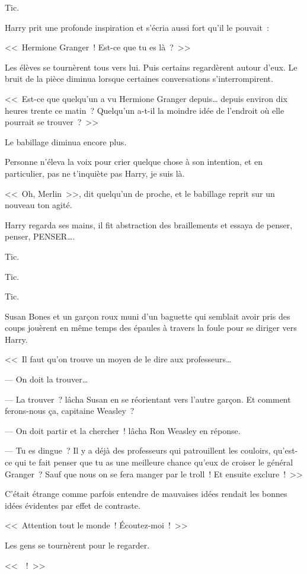 Tic.

Harry prit une profonde inspiration et s'écria aussi fort qu'il le pouvait~:

<<~Hermione Granger~! Est-ce que tu es là~?~>>

Les élèves se tournèrent tous vers lui. Puis certains regardèrent autour d'eux. Le bruit de la pièce diminua lorsque certaines conversations s'interrompirent.

<<~Est-ce que quelqu'un a vu Hermione Granger depuis… depuis environ dix heures trente ce matin~? Quelqu'un a-t-il la moindre idée de l'endroit où elle pourrait se trouver~?~>>

Le babillage diminua encore plus.

Personne n'éleva la voix pour crier quelque chose à son intention, et en particulier, pas ne t'inquiète pas Harry, je suis là.

<<~Oh, Merlin~>>, dit quelqu'un de proche, et le babillage reprit sur un nouveau ton agité.

Harry regarda ses mains, il fit abstraction des braillements et essaya de penser, penser, PENSER….

Tic.

Tic.

Tic.

Susan Bones et un garçon roux muni d'un baguette qui semblait avoir pris des coups jouèrent en même temps des épaules à travers la foule pour se diriger vers Harry.

<<~Il faut qu'on trouve un moyen de le dire aux professeurs…

--- On doit la trouver…

--- La trouver~? lâcha Susan en se réorientant vers l'autre garçon. Et comment ferons-nous ça, capitaine Weasley~?

--- On doit partir et la chercher~! lâcha Ron Weasley en réponse.

--- Tu es dingue~? Il y a déjà des professeurs qui patrouillent les couloirs, qu'est-ce qui te fait penser que tu as une meilleure chance qu'eux de croiser le général Granger~? Sauf que nous on se fera manger par le troll~! Et ensuite exclure~!~>>

C'était étrange comme parfois entendre de mauvaises idées rendait les bonnes idées évidentes par effet de contraste.

<<~Attention tout le monde~! Écoutez-moi~!~>>

Les gens se tournèrent pour le regarder.

<<~~!~>>

